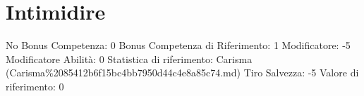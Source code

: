 \section{Intimidire}\label{intimidire}

\begin{description}
\tightlist
\item[Tags: ABI]
No Bonus Competenza: 0 Bonus Competenza di Riferimento: 1 Modificatore:
-5 Modificatore Abilità: 0 Statistica di riferimento: Carisma
(Carisma\%2085412b6f15bc4bb7950d44c4e8a85c74.md) Tiro Salvezza: -5
Valore di riferimento: 0
\end{description}
